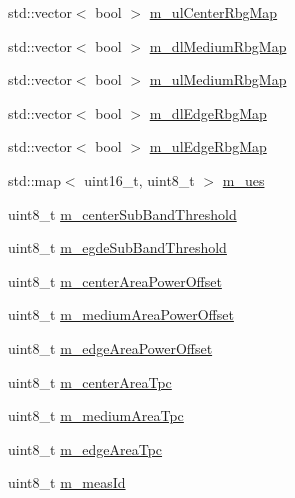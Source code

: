 \begin{DoxyCompactItemize}
\item 
std\+::vector$<$ bool $>$ \hyperlink{classns3_1_1LteFfrSoftAlgorithm_a8c4a9659b1df71b8a4e46b0dc7f678c5}{m\+\_\+ul\+Center\+Rbg\+Map}
\item 
std\+::vector$<$ bool $>$ \hyperlink{classns3_1_1LteFfrSoftAlgorithm_a36896d56b24dae05daa4557f067f91d4}{m\+\_\+dl\+Medium\+Rbg\+Map}
\item 
std\+::vector$<$ bool $>$ \hyperlink{classns3_1_1LteFfrSoftAlgorithm_a20218dc61eebe617493a976b83fa4e19}{m\+\_\+ul\+Medium\+Rbg\+Map}
\item 
std\+::vector$<$ bool $>$ \hyperlink{classns3_1_1LteFfrSoftAlgorithm_a3df3b72d38a58d069409c4af60be0b42}{m\+\_\+dl\+Edge\+Rbg\+Map}
\item 
std\+::vector$<$ bool $>$ \hyperlink{classns3_1_1LteFfrSoftAlgorithm_a9ed12768474ee1b0292954bc23942a23}{m\+\_\+ul\+Edge\+Rbg\+Map}
\item 
std\+::map$<$ uint16\+\_\+t, uint8\+\_\+t $>$ \hyperlink{classns3_1_1LteFfrSoftAlgorithm_ad91e051d77e6fda38a1429ac2dd0fc3b}{m\+\_\+ues}
\item 
uint8\+\_\+t \hyperlink{classns3_1_1LteFfrSoftAlgorithm_ac4ac7ef3bbd34f07e389f27acd3b688a}{m\+\_\+center\+Sub\+Band\+Threshold}
\item 
uint8\+\_\+t \hyperlink{classns3_1_1LteFfrSoftAlgorithm_a57371c026141c475aa45dac00ea08c1c}{m\+\_\+egde\+Sub\+Band\+Threshold}
\item 
uint8\+\_\+t \hyperlink{classns3_1_1LteFfrSoftAlgorithm_ab97f616fab16eab204439acd039df16e}{m\+\_\+center\+Area\+Power\+Offset}
\item 
uint8\+\_\+t \hyperlink{classns3_1_1LteFfrSoftAlgorithm_a4e720ede1d4d434abffd87a25495be59}{m\+\_\+medium\+Area\+Power\+Offset}
\item 
uint8\+\_\+t \hyperlink{classns3_1_1LteFfrSoftAlgorithm_a5bfcbf15084a9fc8eaffb87b9df11c89}{m\+\_\+edge\+Area\+Power\+Offset}
\item 
uint8\+\_\+t \hyperlink{classns3_1_1LteFfrSoftAlgorithm_a2603343b6e59edefa75a47b40f1d2122}{m\+\_\+center\+Area\+Tpc}
\item 
uint8\+\_\+t \hyperlink{classns3_1_1LteFfrSoftAlgorithm_a6e77e31e179ddde74613832daf3ca87b}{m\+\_\+medium\+Area\+Tpc}
\item 
uint8\+\_\+t \hyperlink{classns3_1_1LteFfrSoftAlgorithm_aeec11300e4db685b334e594e009d20fd}{m\+\_\+edge\+Area\+Tpc}
\item 
uint8\+\_\+t \hyperlink{classns3_1_1LteFfrSoftAlgorithm_ac5cb7929c100c0b2ed88f67113ddd6b9}{m\+\_\+meas\+Id}
\end{DoxyCompactItemize}

